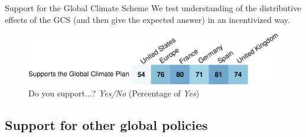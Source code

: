 \documentclass[aspectratio=169,xcolor=dvipsnames, 11pt,mathserif]{beamer}
\begin{document}
\begin{framefont}{\small}
\begin{frame}{Support for the Global Climate Scheme\label{gcs_support}}
\bbvsp %
\ip We test understanding of the distributive effects of the GCS%
(and then give the expected answer) in an incentivized way.%
\hyperlink{understanding}{}
\ee \vspace{-.3cm}
    \begin{figure}
        \centering %
        \caption{Do you support...? \textit{Yes/No} (Percentage of \textit{Yes}) \hyperlink{gcs_perceptions}{} \hyperlink{conjoint_ab}{} \hyperlink{gcs_vote}{} \hyperlink{national_policies}{}}
        \includegraphics[width=\textwidth]{../figures/country_comparison/gcs_support_positive.pdf} %
    \end{figure}
\end{frame}

\subsection{Support for other global policies}


\end{framefont}
\end{document}
